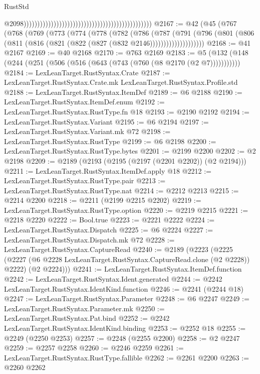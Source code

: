 \begin{lexlean}{RustStd}
\begin{coremodule}
{\begin{coremodule}
{{{{{{{{{{{{{{                                                                                                  @2098)))))))))))))))))))))))))))))))))))))))))))))))
@2167 := @42
    (@45
      (@767
        (@768
          (@769
            (@773
              (@774
                (@778
                  (@782
                    (@786
                      (@787
                        (@791
                          (@796
                            (@801
                              (@806 (@811 (@816 (@821 (@822 (@827 (@832 @2146))))))))))))))))))))
@2168 := @41 @2167
@2169 := @40 @2168
@2170 := @763 @2169
@2183 := @5 (@132 (@148 (@244 (@251 (@506 (@516 (@643 (@743 (@760 (@8 @2170 (@2 @7)))))))))))
@2184 := LexLeanTarget.RustSyntax.Crate
@2187 := LexLeanTarget.RustSyntax.Crate.mk LexLeanTarget.RustSyntax.Profile.std
@2188 := LexLeanTarget.RustSyntax.ItemDef
@2189 := @6 @2188
@2190 := LexLeanTarget.RustSyntax.ItemDef.enum
@2192 := LexLeanTarget.RustSyntax.RustType.fn @18
@2193 := @2190 @2192
@2194 := LexLeanTarget.RustSyntax.Variant
@2195 := @6 @2194
@2197 := LexLeanTarget.RustSyntax.Variant.mk @72
@2198 := LexLeanTarget.RustSyntax.RustType
@2199 := @6 @2198
@2200 := LexLeanTarget.RustSyntax.RustType.bytes
@2201 := @2199 @2200
@2202 := @2 @2198
@2209 := @2189 (@2193 (@2195 (@2197 (@2201 @2202)) (@2 @2194)))
@2211 := LexLeanTarget.RustSyntax.ItemDef.apply @18
@2212 := LexLeanTarget.RustSyntax.RustType.pair
@2213 := LexLeanTarget.RustSyntax.RustType.nat
@2214 := @2212 @2213
@2215 := @2214 @2200
@2218 := @2211 (@2199 @2215 @2202)
@2219 := LexLeanTarget.RustSyntax.RustType.option
@2220 := @2219 @2215
@2221 := @2218 @2220
@2222 := Bool.true
@2223 := @2221 @2222
@2224 := LexLeanTarget.RustSyntax.Dispatch
@2225 := @6 @2224
@2227 := LexLeanTarget.RustSyntax.Dispatch.mk @72
@2228 := LexLeanTarget.RustSyntax.CaptureRead
@2240 := @2189
    (@2223
      (@2225
        (@2227 (@6 @2228 LexLeanTarget.RustSyntax.CaptureRead.clone (@2 @2228)) @2222)
        (@2 @2224)))
@2241 := LexLeanTarget.RustSyntax.ItemDef.function
@2242 := LexLeanTarget.RustSyntax.Ident.generated
@2244 := @2242 LexLeanTarget.RustSyntax.IdentKind.function
@2246 := @2241 (@2244 @18)
@2247 := LexLeanTarget.RustSyntax.Parameter
@2248 := @6 @2247
@2249 := LexLeanTarget.RustSyntax.Parameter.mk
@2250 := LexLeanTarget.RustSyntax.Pat.bind
@2252 := @2242 LexLeanTarget.RustSyntax.IdentKind.binding
@2253 := @2252 @18
@2255 := @2249 (@2250 @2253)
@2257 := @2248 (@2255 @2200)
@2258 := @2 @2247
@2259 := @2257 @2258
@2260 := @2246 @2259
@2261 := LexLeanTarget.RustSyntax.RustType.fallible
@2262 := @2261 @2200
@2263 := @2260 @2262
}}}}}}}}}}}}}}
\end{coremodule}}
\end{coremodule}
\end{lexlean}

